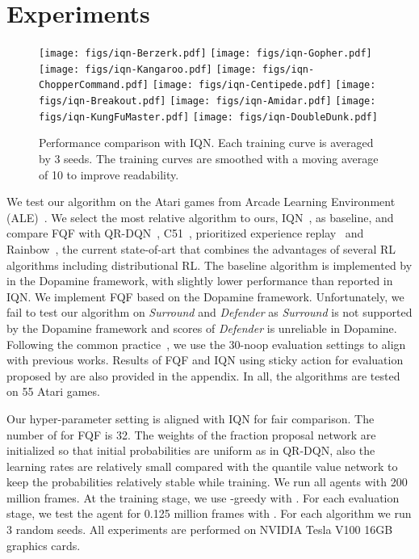 \documentclass{article}
\begin{document}
\section{Experiments}

\begin{figure*}[t!]
    \centering
    \texttt{[image: figs/iqn-Berzerk.pdf]}
    \texttt{[image: figs/iqn-Gopher.pdf]}
    \texttt{[image: figs/iqn-Kangaroo.pdf]}
    \texttt{[image: figs/iqn-ChopperCommand.pdf]}
    \texttt{[image: figs/iqn-Centipede.pdf]}
    \texttt{[image: figs/iqn-Breakout.pdf]}
    \texttt{[image: figs/iqn-Amidar.pdf]}
    \texttt{[image: figs/iqn-KungFuMaster.pdf]}
    \texttt{[image: figs/iqn-DoubleDunk.pdf]}

    \caption{Performance comparison with IQN. Each training curve is averaged by 3 seeds. The training curves are smoothed with a moving average of 10 to improve readability.}
    \label{curve}
\end{figure*}

We test our algorithm on the Atari games from Arcade Learning Environment (ALE)~\cite{bellemare2013arcade}. We select the most relative algorithm to ours, IQN~\citep{dabney2018implicit}, as baseline, and compare FQF with QR-DQN~\citep{dabney2018distributional}, C51~\citep{bellemare2017distributional}, prioritized experience replay~\citep{schaul2016prioritized} and Rainbow~\citep{hessel2018rainbow}, the current state-of-art that combines the advantages of several RL algorithms including distributional RL. The baseline algorithm is implemented by \cite{castro18dopamine} in the Dopamine framework, with slightly lower performance than reported in IQN. We implement FQF based on the Dopamine framework. Unfortunately, we fail to test our algorithm on \textit{Surround} and \textit{Defender} as \textit{Surround} is not supported by the Dopamine framework and scores of \textit{Defender} is unreliable in Dopamine. Following the common practice~\citep{van2016deep}, we use the 30-noop evaluation settings to align with previous works. Results of FQF and IQN using sticky action for evaluation proposed by \cite{machado2018revisiting} are also provided in the appendix. In all, the algorithms are tested on 55 Atari games.

Our hyper-parameter setting is aligned with IQN for fair comparison. The number of  for FQF is 32. The weights of the fraction proposal network are initialized so that initial probabilities are uniform as in QR-DQN, also the learning rates are relatively small compared with the quantile value network to keep the probabilities relatively stable while training. We run all agents with 200 million frames. At the training stage, we use -greedy with . For each evaluation stage, we test the agent for 0.125 million frames with . For each algorithm we run 3 random seeds. All experiments are performed on NVIDIA Tesla V100 16GB graphics cards. 
\end{document}

